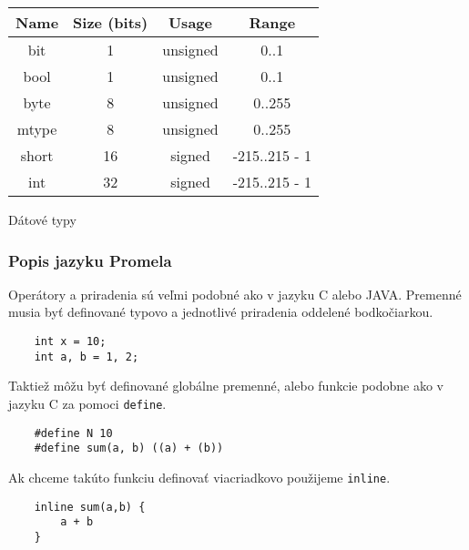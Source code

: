 \begin{center}
    \begin{tabular}{|c|c|c|c|}
    \hline
    \textbf{Name} & \textbf{Size (bits)} & \textbf{Usage} & \textbf{Range} \\ \hline
    bit           & 1                    & unsigned       & 0..1           \\ \hline
    bool          & 1                    & unsigned       & 0..1           \\ \hline
    byte          & 8                    & unsigned       & 0..255         \\ \hline
    mtype         & 8                    & unsigned       & 0..255         \\ \hline
    short         & 16                   & signed         & -215..215 - 1  \\ \hline
    int           & 32                   & signed         & -215..215 - 1  \\ \hline
    \end{tabular}
    \begin{table}[!h]
		\caption[Dátové typy]{Dátové typy}
		\label{obr:tabdatatypes}
	\end{table}
\end{center}

\subsubsection{Popis jazyku Promela}
Operátory a priradenia sú veľmi podobné ako v jazyku C alebo JAVA. Premenné musia byť definované
typovo a jednotlivé priradenia oddelené bodkočiarkou.

\begin{lstlisting}
    int x = 10;
    int a, b = 1, 2;
\end{lstlisting}

Taktiež môžu byť definované globálne premenné, alebo funkcie podobne ako v jazyku C za pomoci 
\texttt{define}.

\begin{lstlisting}
    #define N 10
    #define sum(a, b) ((a) + (b))
\end{lstlisting}

Ak chceme takúto funkciu definovať viacriadkovo použijeme \texttt{inline}.

\begin{lstlisting}
    inline sum(a,b) {
        a + b
    }
\end{lstlisting}

